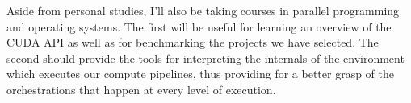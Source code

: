 \documentclass[11pt, conference, onecolumn, final]{IEEEtran}
\begin{document}
Aside from personal studies, I'll also be taking courses in parallel
programming and operating systems.
The first will be useful for learning an overview of the CUDA API as well as
for benchmarking the projects we have selected.
The second should provide the tools for interpreting the internals of the
environment which executes our compute pipelines, thus providing for a better
grasp of the orchestrations that happen at every level of execution.



\end{document}
